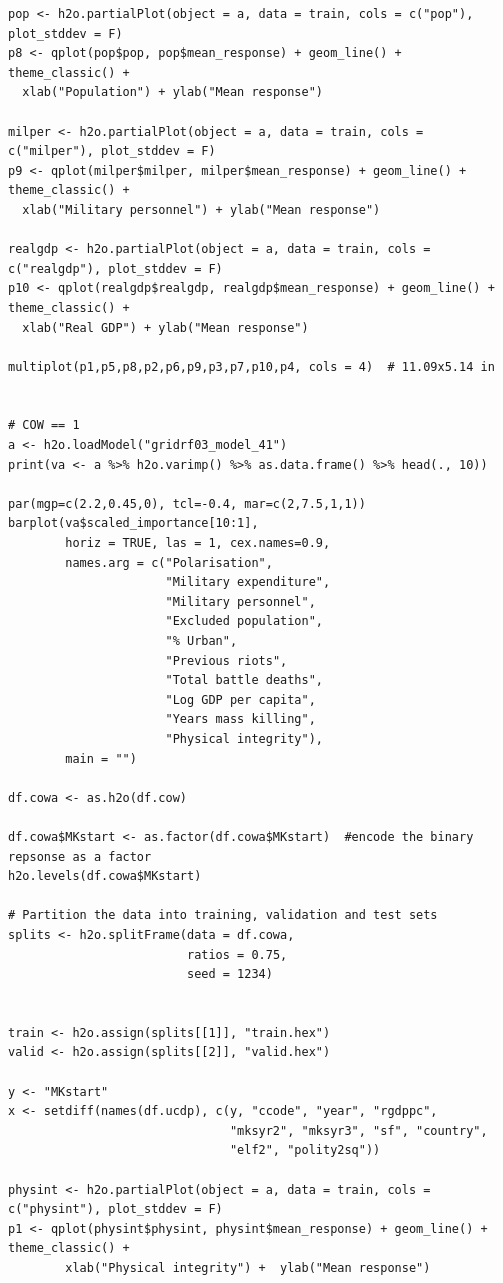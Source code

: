 \begin{verbatim}
pop <- h2o.partialPlot(object = a, data = train, cols = c("pop"), plot_stddev = F)
p8 <- qplot(pop$pop, pop$mean_response) + geom_line() + theme_classic() +
  xlab("Population") + ylab("Mean response")

milper <- h2o.partialPlot(object = a, data = train, cols = c("milper"), plot_stddev = F)
p9 <- qplot(milper$milper, milper$mean_response) + geom_line() + theme_classic() +
  xlab("Military personnel") + ylab("Mean response")

realgdp <- h2o.partialPlot(object = a, data = train, cols = c("realgdp"), plot_stddev = F)
p10 <- qplot(realgdp$realgdp, realgdp$mean_response) + geom_line() + theme_classic() +
  xlab("Real GDP") + ylab("Mean response")

multiplot(p1,p5,p8,p2,p6,p9,p3,p7,p10,p4, cols = 4)  # 11.09x5.14 in


# COW == 1
a <- h2o.loadModel("gridrf03_model_41")
print(va <- a %>% h2o.varimp() %>% as.data.frame() %>% head(., 10)) 

par(mgp=c(2.2,0.45,0), tcl=-0.4, mar=c(2,7.5,1,1))
barplot(va$scaled_importance[10:1],
        horiz = TRUE, las = 1, cex.names=0.9,
        names.arg = c("Polarisation",
                      "Military expenditure",
                      "Military personnel",
                      "Excluded population", 
                      "% Urban",
                      "Previous riots",
                      "Total battle deaths", 
                      "Log GDP per capita",
                      "Years mass killing",
                      "Physical integrity"),
        main = "")

df.cowa <- as.h2o(df.cow)

df.cowa$MKstart <- as.factor(df.cowa$MKstart)  #encode the binary repsonse as a factor
h2o.levels(df.cowa$MKstart)

# Partition the data into training, validation and test sets
splits <- h2o.splitFrame(data = df.cowa, 
                         ratios = 0.75,  
                         seed = 1234) 


train <- h2o.assign(splits[[1]], "train.hex")   
valid <- h2o.assign(splits[[2]], "valid.hex") 

y <- "MKstart"
x <- setdiff(names(df.ucdp), c(y, "ccode", "year", "rgdppc",
                               "mksyr2", "mksyr3", "sf", "country",
                               "elf2", "polity2sq")) 

physint <- h2o.partialPlot(object = a, data = train, cols = c("physint"), plot_stddev = F)
p1 <- qplot(physint$physint, physint$mean_response) + geom_line() + theme_classic() + 
        xlab("Physical integrity") +  ylab("Mean response")


\end{verbatim}
